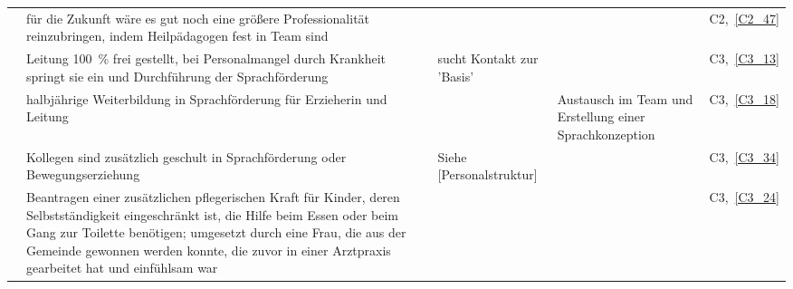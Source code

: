 \begin{landscape}
\begin{small}
\begin{centering}
\begin{longtable}{p{2cm}p{8.5cm}p{4cm}p{4cm}p{1.5cm}}
\cmidrule{2 - 5}
& für die Zukunft wäre es gut noch eine größere Professionalität reinzubringen, indem Heilpädagogen fest in Team sind & & & C2,~\ref{C2_47}\\ 
\cmidrule{2 - 5}
& Leitung 100~\% frei gestellt, bei Personalmangel durch Krankheit springt sie ein und Durchführung der Sprachförderung & sucht Kontakt zur 'Basis' & & C3,~\ref{C3_13}\\
\cmidrule{2 - 5}
& halbjährige Weiterbildung in Sprachförderung für Erzieherin und Leitung & & Austausch im Team und Erstellung einer Sprachkonzeption & C3,~\ref{C3_18}\\ 
\cmidrule{2 - 5}
& Kollegen sind zusätzlich geschult in Sprachförderung oder Bewegungserziehung & Siehe {[Personalstruktur]} & & C3,~\ref{C3_34}\\
\cmidrule{2 - 5}
& Beantragen einer zusätzlichen pflegerischen Kraft für Kinder, deren Selbstständigkeit eingeschränkt ist, die Hilfe beim Essen oder beim Gang zur Toilette benötigen; umgesetzt durch eine Frau, die aus der Gemeinde gewonnen werden konnte, die zuvor in einer Arztpraxis gearbeitet hat und einfühlsam war\vspace{0.5em}& & & C3,~\ref{C3_24}\\


\end{longtable}
\end{centering}
\end{small}
\end{landscape}
